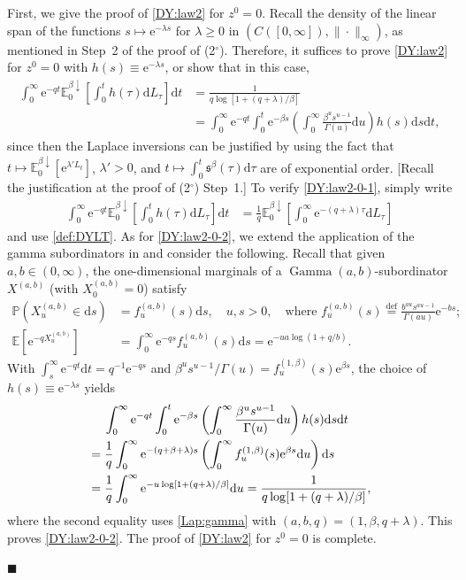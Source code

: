 \documentclass[12pt, twoside]{article}
\numberwithin{figure}{section}
\newcommand{\e}{{\mathrm e}}
\newcommand{\1}{\mathds 1}
\newcommand{\da}{{\downarrow}}
\newcommand{\E}{{\mathbb E}}
\renewcommand{\d}{{\mathrm d}}
\newcommand{\2}{{\mathbf 1}}
\newcommand{\s}{{\mathfrak s}}
\renewenvironment{proof}[1][\proofname]{\noindent {\bfseries #1.}\;}{\hfill\ensuremath{\blacksquare}\\}
\newcommand{\cc}{{^\circ}}
\begin{document}
\begin{proof}[Proof of Theorem~\ref{thm:formulas}]
\noindent {\bf (3$\cc$)} First,
we give the proof of \eqref{DY:law2} for $z^0=0$. Recall the density of the linear span of the functions $s\mapsto \e^{-\lambda s}$ for $\lambda\geq 0$ in $(C([0,\infty]),\|\cdot\|_\infty)$, as mentioned in Step~2 of the proof of (2$\cc$). Therefore, it suffices to prove \eqref{DY:law2} for $z^0=0$ with $h(s)\equiv \e^{-\lambda s}$, or show that in this case,
\begin{align}
\int_0^\infty\e^{-qt}\E^{\beta\da}_0\left[\int_0^t h(\tau)\d L_\tau\right]\d t&=\frac{1}{q\log [1+(q+\lambda)/\beta]}\label{DY:law2-0-1}\\
&=\int_0^\infty \e^{-qt}\int_0^t \e^{-\beta s}\left(\int_0^\infty\frac{\beta^u s^{u-1}}{\Gamma(u)}\d u \right)h(s)\d s\d t,\label{DY:law2-0-2}
\end{align}
since then the Laplace inversions can be justified by using the fact that $t\mapsto \E^{\beta\da}_0[\e^{\lambda' L_t}]$, $\lambda'>0$, and $t\mapsto \int_0^t \s^{\beta}(\tau)\d \tau$ are of exponential order. [Recall the justification at the proof of (2$\cc$) Step~1.]
To verify \eqref{DY:law2-0-1}, simply write
 \begin{align}
\int_0^\infty\e^{-qt}\E^{\beta\da}_0\left[\int_0^t h(\tau)\d L_\tau\right]\d t&=\frac{1}{q}\E^{\beta\da}_0\left[\int_0^\infty \e^{-(q+\lambda)\tau}\d L_\tau\right]
\end{align}
and use \eqref{def:DYLT}. As for \eqref{DY:law2-0-2}, we extend the application of the gamma subordinators in \cite[Proposition~5.1]{C:DBG} and consider the following. Recall that given $a,b\in (0,\infty )$, the one-dimensional marginals of
a $\operatorname{Gamma} (a,b)$-subordinator $X^{(a,b)}$ (with $X^{(a,b)}_0=0$) \cite[p.73]{Bertoin} satisfy 
\begin{align}
\label{def:Gamma} {\mathbb P}(X^{(a,b)}_{u}\in \mathrm{d}
s )&= f^{(a,b)}_{u}(s )\mathrm{d}s,\quad u,s>0,
\quad \text{where } f^{(a,b)}_{u}(s )\! \stackrel{
\mathrm{def}} {=}\frac{b^{au}s ^{au-1}}{\Gamma (au)}{\mathrm{e}}^{-b
s};\\
\label{Lap:gamma} {\mathbb E}[{\mathrm{e}}^{-q X^{(a,b)}_{u}}]&=
\int _{0}^{\infty }{\mathrm{e}}^{-qs} f^{(a,b)}_{u}(
s )\mathrm{d} s ={\mathrm{e}}^{-u a\log (1+q/b)}. 
\end{align}
With $\int_s^\infty \e^{-qt}\d t=q^{-1}\e^{-qs}$ and $\beta^us^{u-1}/\Gamma(u)=f_u^{(1,\beta)}(s)\e^{\beta s}$, the choice of $h(s)\equiv \e^{-\lambda s}$ yields
\begin{align}
&\quad\;\int_0^\infty \e^{-qt}\int_0^t \e^{-\beta s}\left(\int_0^\infty\frac{\beta^u s^{u-1}}{\Gamma(u)}\d u \right)h(s)\d s\d t\notag\\
&=\frac{1}{q}\int_0^\infty \e^{-(q+\beta+\lambda) s}\left(\int_0^\infty f_u^{(1,\beta)}(s)\e^{\beta s}\d u\right)\d s\notag\\
&=\frac{1}{q}\int_0^\infty \e^{-u\log [1+(q+\lambda)/\beta]}\d u
=\frac{1}{q\log [1+(q+\lambda)/\beta]},\label{sbeta:Lap}
\end{align}
where the second equality uses \eqref{Lap:gamma} with
$(a,b,q)=(1,\beta ,q+\lambda )$. This proves \eqref{DY:law2-0-2}. The proof of \eqref{DY:law2} for $z^0=0$ is complete.


\end{proof}
\end{document}
